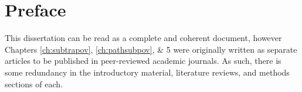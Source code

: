 \documentclass[11 pt, letterpaper]{report}
\begin{document}





%
%
%
%

%
%
%
%
%
%
%


\newpage





\tableofcontents


\newpage







\listoffigures

\newpage



\listoftables



\hypersetup{
	colorlinks=true,
	linkcolor=red,
	citecolor=blue,
	urlcolor=blue
}



\newpage


\chapter*{Preface}


This dissertation can be read as a complete and coherent document, however Chapters \ref{ch:subtrapov}, \ref{ch:pathsubpov}, \& 5 were originally written as separate articles to be published in peer-reviewed academic journals. As such, there is some redundancy in the introductory material, literature reviews, and methods sections of each. 
\end{document}
